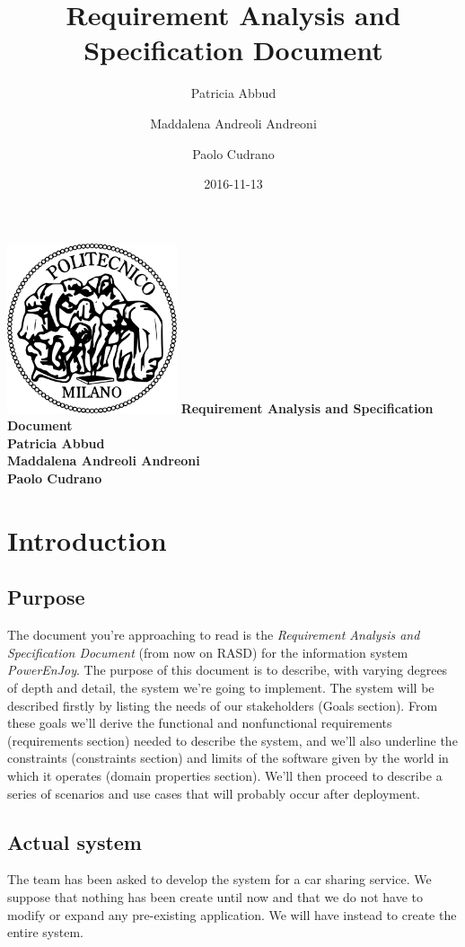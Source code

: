 \documentclass[12pt, a4paper]{article}
\title{Requirement Analysis and Specification Document}
\date{2016-11-13}
\author{
	Patricia Abbud
	\and
	Maddalena Andreoli Andreoni
	\and
	Paolo Cudrano
}
\begin{document}
	\begin{titlepage}
		\centering
		\includegraphics[width=5cm]{img/polimi_logo.png} %
		\vfill
		{\bfseries\Large
			Requirement Analysis and Specification Document\\
			\vskip4cm
			Patricia Abbud\\
			Maddalena Andreoli Andreoni\\
			Paolo Cudrano\\
		}
		\vfill
		\vfill
	\end{titlepage}

	\tableofcontents
	\newpage

	\section{Introduction}
		\subsection{Purpose}
			The document you're approaching to read is the \textit{Requirement Analysis and Specification Document} (from now on RASD) for the information system \textit{PowerEnJoy}. The purpose of this document is to describe, with varying degrees of depth and detail, the system we're going to implement. The system will be described firstly by listing the needs of our stakeholders (Goals section). From these goals we'll derive the functional and nonfunctional requirements (requirements section) needed to describe the system, and we'll also underline the constraints (constraints section) and limits of the software given by the world in which it operates (domain properties section). We'll then proceed to describe a series of scenarios and use cases that will probably occur after deployment.  
			
		\subsection{Actual system}
			The team has been asked to develop the system for a car sharing service. We suppose that nothing has been create until now and that we do not have to modify or expand any pre-existing application. We will have instead to create the entire system.
		
\end{document}
